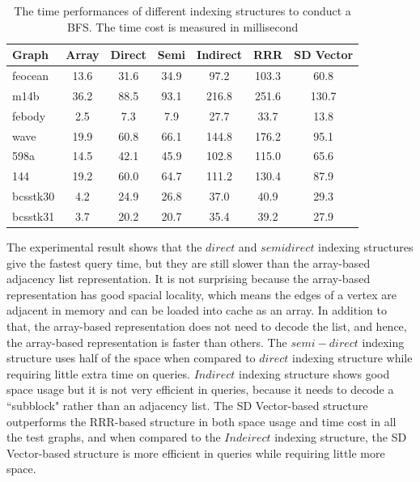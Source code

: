 \documentclass[12pt,glossary]{dalthesis}
\begin{document}
\begin{table}[ht]
\centering
\caption{The time performances of different indexing structures to conduct a BFS. The time cost is measured in millisecond}
\label{my-label}
\begin{tabular}{|l||c||c||c||c||c||c|}
\hline
Graph    & Array & Direct & Semi & Indirect & RRR & SD Vector \\ \hline
feocean  &   13.6    &   31.6     &   34.9   &    97.2      &  103.3   & 60.8          \\
m14b     &   36.2    &    88.5    &   93.1   &   216.8   &  251.6   &   130.7        \\
febody   &   2.5    &    7.3    &   7.9   &     27.7    &   33.7  &     13.8      \\
wave     &    19.9   &    60.8    &   66.1   &    144.8     &   176.2  &   95.1        \\
598a     &    14.5   &    42.1    &   45.9   &    102.8     &  115.0   &    65.6       \\
144      &   19.2    &    60.0    &   64.7   &     111.2     &  130.4   &  87.9         \\
bcsstk30 &   4.2    &    24.9    &   26.8   &    37.0    &   40.9  &  29.3         \\
bcsstk31 &    3.7   &    20.2    &   20.7   &     35.4    &   39.2  &  27.9         \\ \hline
\end{tabular}
\end{table}

\bigskip

The experimental result shows that the $direct$ and $semi direct$ indexing structures give the fastest query time, but they are still slower than the array-based adjacency list representation. It is not surprising because the array-based representation has good spacial locality, which means the edges of a vertex are adjacent in memory and can be loaded into cache as an array. In addition to that, the array-based representation does not need to decode the list, and hence, the array-based representation is faster than others. The $semi-direct$ indexing structure uses half of the space when compared to $direct$ indexing structure while requiring little extra time on queries. $Indirect$ indexing structure shows good space usage but it is not very efficient in queries, because it needs to decode a ``subblock" rather than an adjacency list. The SD Vector-based structure outperforms the RRR-based structure in both space usage and time cost in all the test graphs, and when compared to the $Indeirect$ indexing structure, the SD Vector-based structure is more efficient in queries while requiring little more space.   
\end{document}
